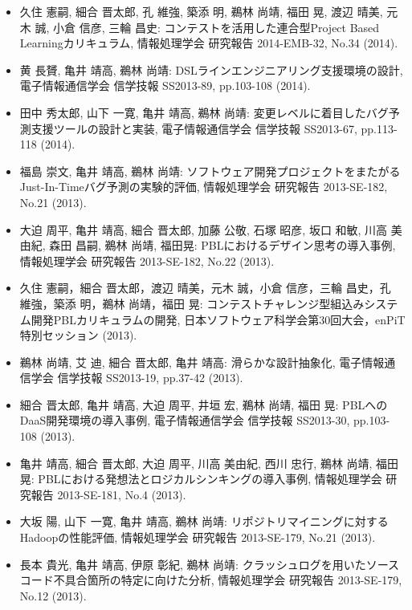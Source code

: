 \documentclass{jarticle}
\begin{document}
\begin{itemize}
\item 久住 憲嗣, 細合 晋太郎, 孔 維強, 築添 明, 鵜林 尚靖, 福田 晃, 渡辺 晴美, 元木 誠, 小倉 信彦, 三輪 昌史:
コンテストを活用した連合型Project Based Learningカリキュラム,
情報処理学会 研究報告 2014-EMB-32, No.34 (2014).

\item 黄 長贇, 亀井 靖高, 鵜林 尚靖:
DSLラインエンジニアリング支援環境の設計,
電子情報通信学会 信学技報 SS2013-89, pp.103-108 (2014).

\item 田中 秀太郎, 山下 一寛, 亀井 靖高, 鵜林 尚靖:
変更レベルに着目したバグ予測支援ツールの設計と実装,
電子情報通信学会 信学技報 SS2013-67, pp.113-118 (2014).

\item 福島 崇文, 亀井 靖高, 鵜林 尚靖:
ソフトウェア開発プロジェクトをまたがるJust-In-Timeバグ予測の実験的評価,
情報処理学会 研究報告 2013-SE-182, No.21 (2013).

\item 大迫 周平, 亀井 靖高, 細合 晋太郎, 加藤 公敬, 石塚 昭彦, 坂口 和敏, 川高 美由紀, 森田 昌嗣, 鵜林 尚靖, 福田晃:
PBLにおけるデザイン思考の導入事例,
情報処理学会 研究報告 2013-SE-182, No.22 (2013).

\item 久住 憲嗣，細合 晋太郎，渡辺 晴美，元木 誠，小倉 信彦，三輪 昌史，孔 維強，築添 明，鵜林 尚靖，福田 晃:
コンテストチャレンジ型組込みシステム開発PBLカリキュラムの開発,
日本ソフトウェア科学会第30回大会，enPiT特別セッション (2013).

\item 鵜林 尚靖, 艾 迪, 細合 晋太郎, 亀井 靖高:
滑らかな設計抽象化,
電子情報通信学会 信学技報 SS2013-19, pp.37-42 (2013).

\item 細合 晋太郎, 亀井 靖高, 大迫 周平, 井垣 宏, 鵜林 尚靖, 福田 晃:
PBLへのDaaS開発環境の導入事例,
電子情報通信学会 信学技報 SS2013-30, pp.103-108 (2013).

\item 亀井 靖高, 細合 晋太郎, 大迫 周平, 川高 美由紀, 西川 忠行, 鵜林 尚靖, 福田 晃:
PBLにおける発想法とロジカルシンキングの導入事例,
情報処理学会 研究報告 2013-SE-181, No.4 (2013).

\item 大坂 陽, 山下 一寛, 亀井 靖高, 鵜林 尚靖:
リポジトリマイニングに対するHadoopの性能評価,
情報処理学会 研究報告 2013-SE-179, No.21 (2013).

\item 長本 貴光, 亀井 靖高, 伊原 彰紀, 鵜林 尚靖:
クラッシュログを用いたソースコード不具合箇所の特定に向けた分析,
情報処理学会 研究報告 2013-SE-179, No.12 (2013).


\end{itemize}
\end{document}

